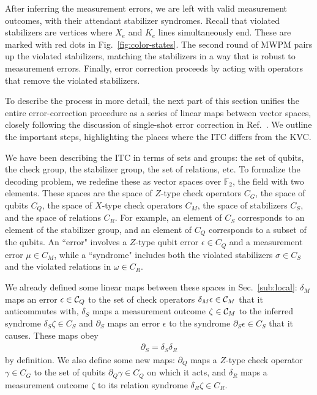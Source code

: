 After inferring the measurement errors, we are left with valid measurement outcomes, with their attendant stabilizer syndromes. Recall that violated stabilizers are vertices where $X_e$ and $K_e$ lines simultaneously end. These are marked with red dots in Fig.~\ref{fig:color-states}. The second round of MWPM pairs up the violated stabilizers, matching the stabilizers in a way that is robust to measurement errors. Finally, error correction proceeds by acting with operators that remove the violated stabilizers.

To describe the process in more detail, the next part of this section unifies the entire error-correction procedure as a series of linear maps between vector spaces, closely following the discussion of single-shot error correction in Ref.~\cite{KubicaVasmer2022}. We outline the important steps, highlighting the places where the ITC differs from the KVC.

We have been describing the ITC in terms of sets and groups: the set of qubits, the check group, the stabilizer group, the set of relations, etc. To formalize the decoding problem, we redefine these as vector spaces over $\mathbb{F}_2$, the field with two elements. These spaces are the space of $Z$-type check operators $C_G$, the space of qubits $C_Q$, the space of $X$-type check operators $C_M$, the space of stabilizers $C_S$, and the space of relations $C_R$.
For example, an element of $C_S$ corresponds to an element of the stabilizer group, and an element of $C_Q$ corresponds to a subset of the qubits. An ``error" involves a $Z$-type qubit error $\epsilon \in C_Q$ and a measurement error $\mu \in C_M$, while a ``syndrome" includes both the violated stabilizers $\sigma \in C_S$ and the violated relations in $\omega \in C_R$.

We already defined some linear maps between these spaces in Sec.~\ref{sub:local}: $\delta_M$ maps an error $\epsilon \in \mathcal{C}_Q$ to the set of check operators $\delta_M\epsilon \in \mathcal{C}_M$ that it anticommutes with, $\delta_S$ maps a measurement outcome $\zeta \in \mathcal{C}_M$ to the inferred syndrome $\delta_S \zeta \in C_S$ and $\partial_S$ maps an error $\epsilon$ to the syndrome $\partial_S \epsilon\in C_S$ that it causes. These maps obey 
\begin{align}
\partial_S = \delta_S \delta_R
\end{align}
by definition.
We also define some new maps: $\partial_Q$ maps a $Z$-type check operator $\gamma \in C_G$ to the set of qubits $\partial_Q\gamma \in C_Q$ on which it acts, and $\delta_R$ maps a measurement outcome $\zeta$ to its relation syndrome $\delta_R \zeta \in C_R$.

